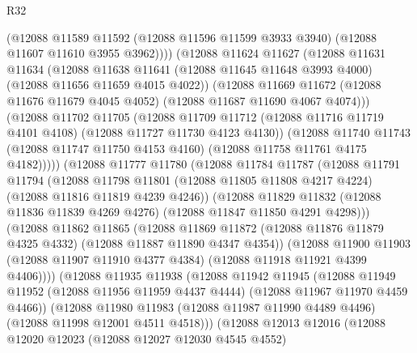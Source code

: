 \begin{lexlean}{R32}
\begin{coremodule}
              (@12088
                @11589
                @11592
                (@12088 @11596 @11599 @3933 @3940)
                (@12088 @11607 @11610 @3955 @3962))))
          (@12088
            @11624
            @11627
            (@12088
              @11631
              @11634
              (@12088
                @11638
                @11641
                (@12088 @11645 @11648 @3993 @4000)
                (@12088 @11656 @11659 @4015 @4022))
              (@12088
                @11669
                @11672
                (@12088 @11676 @11679 @4045 @4052)
                (@12088 @11687 @11690 @4067 @4074)))
            (@12088
              @11702
              @11705
              (@12088
                @11709
                @11712
                (@12088 @11716 @11719 @4101 @4108)
                (@12088 @11727 @11730 @4123 @4130))
              (@12088
                @11740
                @11743
                (@12088 @11747 @11750 @4153 @4160)
                (@12088 @11758 @11761 @4175 @4182)))))
        (@12088
          @11777
          @11780
          (@12088
            @11784
            @11787
            (@12088
              @11791
              @11794
              (@12088
                @11798
                @11801
                (@12088 @11805 @11808 @4217 @4224)
                (@12088 @11816 @11819 @4239 @4246))
              (@12088
                @11829
                @11832
                (@12088 @11836 @11839 @4269 @4276)
                (@12088 @11847 @11850 @4291 @4298)))
            (@12088
              @11862
              @11865
              (@12088
                @11869
                @11872
                (@12088 @11876 @11879 @4325 @4332)
                (@12088 @11887 @11890 @4347 @4354))
              (@12088
                @11900
                @11903
                (@12088 @11907 @11910 @4377 @4384)
                (@12088 @11918 @11921 @4399 @4406))))
          (@12088
            @11935
            @11938
            (@12088
              @11942
              @11945
              (@12088
                @11949
                @11952
                (@12088 @11956 @11959 @4437 @4444)
                (@12088 @11967 @11970 @4459 @4466))
              (@12088
                @11980
                @11983
                (@12088 @11987 @11990 @4489 @4496)
                (@12088 @11998 @12001 @4511 @4518)))
            (@12088
              @12013
              @12016
              (@12088
                @12020
                @12023
                (@12088 @12027 @12030 @4545 @4552)

\end{coremodule}
\end{lexlean}

